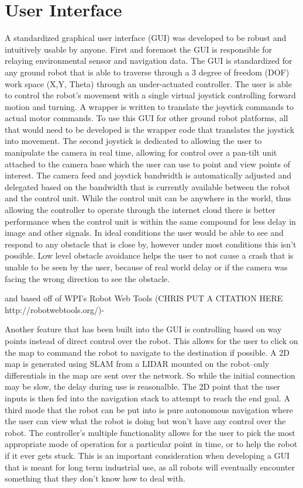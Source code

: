 \section{User Interface}\label{sec:ui}

A standardized graphical user interface (GUI) was developed to be robust and intuitively usable by anyone. First and foremost the GUI is responsible for relaying environmental sensor and navigation data. The GUI is standardized for any ground robot that is able to traverse through a 3 degree of freedom (DOF) work space (X,Y, Theta) through an under-actuated controller. The user is able to control the robot's movement with a single virtual joystick controlling forward motion and turning. A wrapper is written to translate the joystick commands to actual motor commands. To use this GUI for other ground robot platforms, all that would need to be developed is the wrapper code that translates the joystick into movement. The second joystick is dedicated to allowing the user to manipulate the camera in real time, allowing for control over a pan-tilt unit attached to the camera base which the user can use to point and view points of interest. The camera feed and joystick bandwidth is automatically adjusted and delegated based on the bandwidth that is currently  available between the robot and the control unit. While the control unit can be anywhere in the world, thus allowing the controller to operate through the internet cloud there is better performance when the control unit is within the same compound for less delay in image and other signals. In ideal conditions the user would be able to see and respond to any obstacle that is close by, however under most conditions this isn't possible. Low level obstacle avoidance helps the user to not cause a crash that is unable to be seen by the user, because of real world delay or if the camera was facing the wrong direction to see the obstacle.

and based off of WPI's Robot Web Tools (CHRIS PUT A CITATION HERE http://robotwebtools.org/)- 

Another feature that has been built into the GUI is controlling based on way points instead of direct control over the robot. This allows for the user to click on the map to command the robot to navigate to the destination if possible. A 2D map is generated using SLAM from a LIDAR mounted on the robot--only differentials in the map are sent over the network. So while the initial connection may be slow, the delay during use is reasonalble. The 2D point that the user inputs is then fed into the navigation stack to attempt to reach the end goal. A third mode that the robot can be put into is pure autonomous navigation where the user can view what the robot is doing but won't have any control over the robot. The controller's multiple functionality allows for the user to pick the most appropriate mode of operation for a particular point in time, or to help the robot if it ever gets stuck. This is an important consideration when developing a GUI that is meant for long term industrial use, as all robots will eventually encounter something that they don't know how to deal with. 

